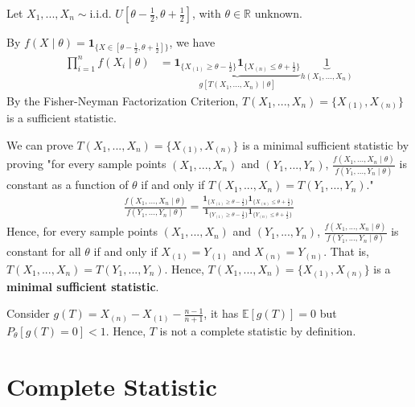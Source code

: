 \documentclass[11pt]{elegantbook}
\begin{document}
\begin{example}
    Let $X_1,...,X_n\sim \text{i.i.d. }U[\theta -\frac{1}{2},\theta + \frac{1}{2}]$, with $\theta \in \mathbb{R}$ unknown.

    By $f(X\mid\theta)=\mathbf{1}_{\{X\in[\theta-\frac{1}{2},\theta+\frac{1}{2}]\}}$, we have
    \begin{equation}
        \begin{aligned}
            \prod_{i=1}^n f(X_i\mid\theta)&=\underbrace{\mathbf{1}_{\{X_{(1)}\geq\theta-\frac{1}{2}\}}\mathbf{1}_{\{X_{(n)}\leq\theta+\frac{1}{2}\}}}_{g[T(X_1,...,X_n)\mid\theta]}\underbrace{1}_{h(X_1,...,X_n)}
        \end{aligned}
        \nonumber
    \end{equation}
    By the Fisher-Neyman Factorization Criterion, $T(X_1,...,X_n)=\{X_{(1)},X_{(n)}\}$ is a sufficient statistic.

    We can prove $T(X_1,...,X_n)=\{X_{(1)},X_{(n)}\}$ is a minimal sufficient statistic by proving "for every sample points $(X_1,...,X_n)$ and $(Y_1,...,Y_n)$, $\frac{f(X_1,...,X_n\mid\theta)}{f(Y_1,...,Y_n\mid\theta)}$ is constant as a function of $\theta$ if and only if $T(X_1,...,X_n)=T(Y_1,...,Y_n)$."
    \begin{equation}
        \begin{aligned}
            \frac{f(X_1,...,X_n\mid\theta)}{f(Y_1,...,Y_n\mid\theta)}=\frac{\mathbf{1}_{\{X_{(1)}\geq\theta-\frac{1}{2}\}}\mathbf{1}_{\{X_{(n)}\leq\theta+\frac{1}{2}\}}}{\mathbf{1}_{\{Y_{(1)}\geq\theta-\frac{1}{2}\}}\mathbf{1}_{\{Y_{(n)}\leq\theta+\frac{1}{2}\}}}
        \end{aligned}
        \nonumber
    \end{equation}
    Hence, for every sample points $(X_1,...,X_n)$ and $(Y_1,...,Y_n)$, $\frac{f(X_1,...,X_n\mid\theta)}{f(Y_1,...,Y_n\mid\theta)}$ is constant for all $\theta$ if and only if $X_{(1)}=Y_{(1)}$ and $X_{(n)}=Y_{(n)}$. That is, $T(X_1,...,X_n)=T(Y_1,...,Y_n)$. Hence, $T(X_1,...,X_n)=\{X_{(1)},X_{(n)}\}$ is a \textbf{minimal sufficient statistic}.

    Consider $g(T)=X_{(n)}-X_{(1)}-\frac{n-1}{n+1}$, it has $\mathbb{E}[g(T)]=0$ but $P_\theta[g(T)=0]<1$. Hence, $T$ is not a complete statistic by definition.
\end{example}


\section{Complete Statistic}
\end{document}
